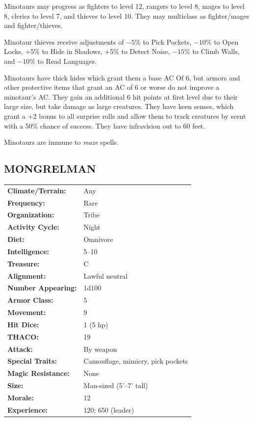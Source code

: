 \begin{multicols}{2}
\begin{minipage}{\columnwidth}
\end{minipage}

Minotaurs may progress as fighters to level 12, rangers to level 8, mages to level 8, clerics to level 7, and thieves to level 10. They may multiclass as fighter/mages and fighter/thieves.

Minotaur thieves receive adjustments of $-5$\% to Pick Pockets, $-10$\% to Open Locks, +5\% to Hide in Shadows, +5\% to Detect Noise, $-15$\% to Climb Walls, and $-10$\% to Read Languages.

Minotaurs have thick hides which grant them a base AC Of 6, but armors and other protective items that grant an AC of 6 or worse do not improve a minotaur's AC. They gain an additional 6 hit points at first level due to their large size, but take damage as large creatures. They have keen senses, which grant a +2 bonus to all surprise rolls and allow them to track creatures by scent with a 50\% chance of success. They have infravision out to 60 feet.

Minotaurs are immune to \textit{maze} spells.

\noindent
\begin{minipage}{\columnwidth}

\vspace{1em}

\subsection{MONGRELMAN}

\noindent \begin{tabular}{p{}p{}}
\textbf{Climate/Terrain:}	& Any	\\
\textbf{Frequency:} 		& Rare	\\
\textbf{Organization:} 		& Tribe	\\
\textbf{Activity Cycle:} 	& Night	\\
\textbf{Diet:} 				& Omnivore	\\
\textbf{Intelligence:} 		& 5--10	\\
\textbf{Treasure:} 			& C	\\
\textbf{Alignment:} 		& Lawful neutral	\\
\hline
\textbf{Number Appearing:} 	& 1d100	\\
\textbf{Armor Class:} 		& 5	\\
\textbf{Movement:} 			& 9	\\
\textbf{Hit Dice:} 			& 1	(5 hp)	\\
\textbf{THACO:} 			& 19	\\
\textbf{Attack:} 			& By weapon	\\
\textbf{Special Traits:} & Camouflage, mimicry, pick pockets	\\
\textbf{Magic Resistance:} 	& None	\\
\textbf{Size:} 				& Man-sized (5'--7' tall)	\\
\textbf{Morale:} 			& 12	\\
\textbf{Experience:} 		& 120; 650 (leader)	\\ %
\end{tabular}


\end{minipage}
\end{multicols}
